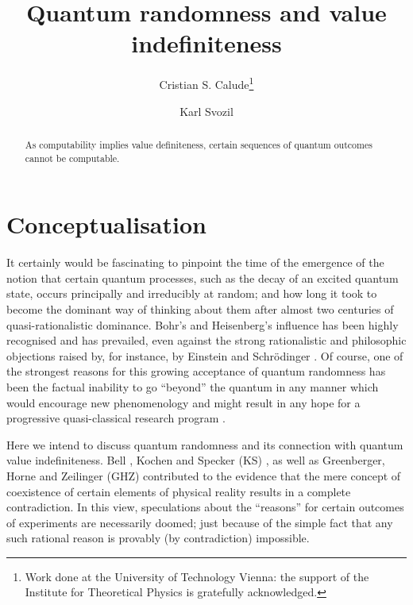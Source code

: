 \documentclass[pra,amsfonts,preprint,showkeys]{revtex4}
\begin{document}



\title{Quantum randomness and value indefiniteness}

\author{Cristian S. Calude\footnote{Work done at the University of Technology Vienna: the support of the Institute for Theoretical Physics is gratefully acknowledged.}}
\author{Karl Svozil}


\begin{abstract}
As computability implies value definiteness, certain sequences of quantum outcomes cannot be computable.
\end{abstract}


\maketitle
\thispagestyle{empty}
\section{Conceptualisation}

It certainly would be fascinating to pinpoint the time
of the emergence of the notion that certain quantum processes, such as the decay
of an excited quantum state, occurs principally and irreducibly at random;
and how long it took
to become the dominant way of thinking about them after almost two centuries
of quasi-rationalistic dominance.
Bohr's and Heisenberg's influence has been highly recognised and has prevailed,
even against the strong rationalistic and philosophic objections
raised by, for instance, by Einstein and Schr\"odinger \cite{jammer:66,jammer1}.
Of course, one of the strongest reasons for this growing acceptance
of quantum randomness has been the factual inability to go ``beyond'' the
quantum in any manner which would encourage new phenomenology and might
result in any hope for a progressive quasi-classical research program  \cite{lakatosch}.

Here we intend to discuss quantum randomness and its connection with
quantum value indefiniteness.
Bell \cite{bell-66,bell,bell-87,pitowsky-89a}, Kochen and Specker (KS) \cite{kochen1},
as well as Greenberger, Horne and Zeilinger (GHZ) \cite{ghz,ghsz,panbdwz}
contributed to the evidence that the mere concept of
coexistence of certain elements of physical reality  \cite{epr}
results in a complete contradiction.
In this view, speculations about the ``reasons'' for certain outcomes of experiments
are necessarily doomed; just because of the simple fact that
any such rational reason is provably (by contradiction) impossible.
\end{document}
